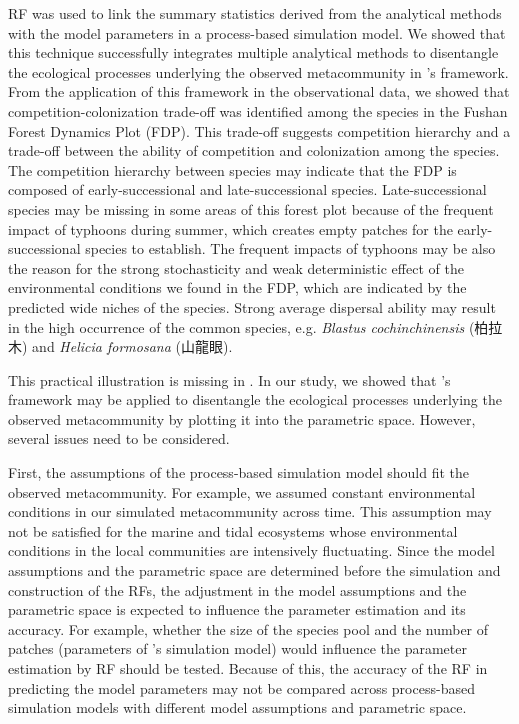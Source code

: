 	RF was used to link the summary statistics derived from the analytical methods with the model parameters in a process-based simulation model. We showed that this technique successfully integrates multiple analytical methods to disentangle the ecological processes underlying the observed metacommunity in \citeauthor{guzman2022accounting}'s framework. From the application of this framework in the observational data, we showed that competition-colonization trade-off was identified among the species in the Fushan Forest Dynamics Plot (FDP). This trade-off suggests competition hierarchy and a trade-off between the ability of competition and colonization among the species. The competition hierarchy between species may indicate that the FDP is composed of early-successional and late-successional species. Late-successional species may be missing in some areas of this forest plot because of the frequent impact of typhoons during summer, which creates empty patches for the early-successional species to establish. The frequent impacts of typhoons may be also the reason for the strong stochasticity and weak deterministic effect of the environmental conditions we found in the FDP, which are indicated by the predicted wide niches of the species. Strong average dispersal ability may result in the high occurrence of the common species, e.g. \textit{Blastus cochinchinensis} (柏拉木) and \textit{Helicia formosana} (山龍眼). 
	
	This practical illustration is missing in \citet{guzman2022accounting}. In our study, we showed that \citeauthor{guzman2022accounting}'s framework may be applied to disentangle the ecological processes underlying the observed metacommunity by plotting it into the parametric space. However, several issues need to be considered.
	
	First, the assumptions of the process-based simulation model should fit the observed metacommunity. For example, we assumed constant environmental conditions in our simulated metacommunity across time. This assumption may not be satisfied for the marine and tidal ecosystems whose environmental conditions in the local communities are intensively fluctuating. Since the model assumptions and the parametric space are determined before the simulation and construction of the RFs, the adjustment in the model assumptions and the parametric space is expected to influence the parameter estimation and its accuracy. For example, whether the size of the species pool and the number of patches (parameters of \citeauthor{thompson2020process}'s simulation model) would influence the parameter estimation by RF should be tested. Because of this, the accuracy of the RF in predicting the model parameters may not be compared across process-based simulation models with different model assumptions and parametric space.
	
